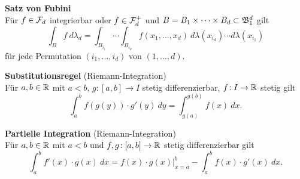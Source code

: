 \textbf{Satz von Fubini}\\
Für $f\in\mathcal{F}_d$ integrierbar oder $f\in\mathcal{F}_d^+$ und
$B = B_1 \times\cdots\times B_d \subset \mathfrak{B}_1^d$ gilt
\[
  \int_B f~d\lambda_d = \int_{B_{i_1}} \cdots \int_{B_{i_d}} f(x_1,\ldots,x_d)~
  d\lambda(x_{i_d}) \cdots d\lambda(x_{i_1})
\]
für jede Permutation $(i_1,\ldots,i_d)$ von $(1,\ldots,d)$.

\textbf{Substitutionsregel} (Riemann-Integration)\\
Für $a,b\in\mathbb{R}$ mit $a<b$, $g\!: [a,b] \to I$ stetig differenzierbar,
$f\!: I\to\mathbb{R}$ stetig gilt
\[
  \int_a^b f(g(y)) \cdot g'(y)~dy = \int_{g(a)}^{g(b)}f(x)~dx.
\]

\textbf{Partielle Integration} (Riemann-Integration)\\
Für $a,b\in\mathbb{R}$ mit $a<b$ und $f,g\!: [a,b]\to\mathbb{R}$ stetig differenzierbar gilt
\[
  \int_a^b f'(x) \cdot g(x)~dx
  = f(x) \cdot g(x) \Big\vert_{x=a}^b - \int_a^b f(x) \cdot g'(x)~dx.
\]
